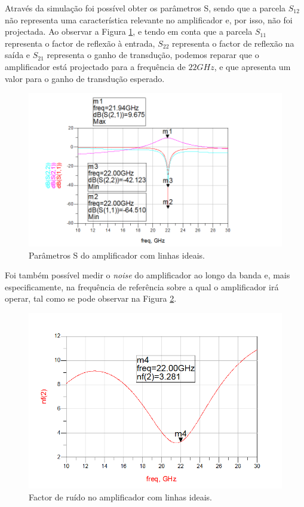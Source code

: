 \documentclass[11pt]{article}
\numberwithin{equation}{section}
\begin{document}
Através da simulação foi possível obter os parâmetros S, sendo que a parcela $S_{12}$ não representa uma característica relevante no amplificador e, por isso, não foi projectada. Ao observar a Figura \ref{fig:ideal_S}, e tendo em conta que a parcela $S_{11}$ representa o factor de reflexão à entrada, $S_{22}$ representa o factor de reflexão na saída e $S_{21}$ representa o ganho de transdução, podemos reparar que o amplificador está projectado para a frequência de $ 22 GHz $, e que apresenta um valor para o ganho de transdução esperado.


\begin{figure}[H]
	\centering
	\includegraphics[keepaspectratio=true, scale=0.45]{exps/Ideal_S}
	\vspace{-0.5em}
	\caption{Parâmetros S do amplificador com linhas ideais.}
	\vspace{-0.8em}
	\label{fig:ideal_S}
\end{figure}

Foi também possível medir o \textit{noise} do amplificador ao longo da banda e, mais especificamente, na frequência de referência sobre a qual o amplificador irá operar, tal como se pode observar na Figura \ref{fig:ideal_noise}.

\begin{figure}[H]
	\centering
	\includegraphics[keepaspectratio=true, scale=0.45]{exps/Ideal_noise}
	\vspace{-0.5em}
	\caption{Factor de ruído no amplificador com linhas ideais.}
	\vspace{-0.8em}
	\label{fig:ideal_noise}
\end{figure}
\end{document}
